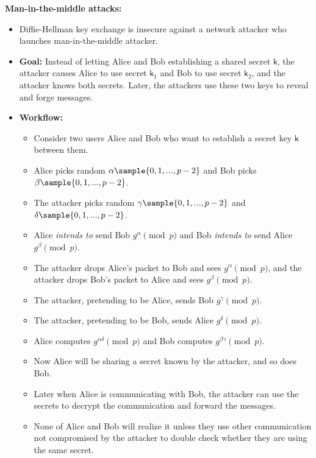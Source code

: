 \documentclass{article}
\newcommand{\msf}[1]{\mathsf{#1}}
\newcommand{\parhead}[1]{\noindent \textbf{#1}}
\begin{document}
\parhead{Man-in-the-middle attacks:}
\begin{itemize}
    \item Diffie-Hellman key exchange is insecure against a network attacker who launches man-in-the-middle attacker.
    
    \item {\bf Goal:} Instead of letting Alice and Bob establishing a shared secret $\msf{k}$, the attacker causes Alice to use secret $\msf{k}_1$ and Bob to use secret $\msf{k}_2$, and the attacker knows both secrets. Later, the attackers use these two keys to reveal and forge messages. 
    
    \item {\bf Workflow:}
    \begin{itemize}
    \item Consider two users Alice and Bob who want to establish a secret key $\msf{k}$ between them.
    
    \item Alice picks random $\alpha\sample\{0,1,...,p-2\}$ and Bob picks $\beta\sample\{0,1,...,p-2\}$.
    
    \item The attacker picks random $\gamma\sample\{0,1,...,p-2\}$ and $\delta\sample\{0,1,...,p-2\}$.
    
    \item Alice \emph{intends to} send Bob $g^\alpha \pmod{p}$ and Bob \emph{intends to} send Alice $g^\beta \pmod{p}$.
    
    \item The attacker drops Alice's packet to Bob and sees $g^\alpha\pmod{p}$, and the attacker drops Bob's packet to Alice and sees $g^\beta\pmod{p}$.
    
    \item The attacker, pretending to be Alice, sends Bob $g^\gamma\pmod{p}$.
    
    \item The attacker, pretending to be Bob, sends Alice $g^\delta\pmod{p}$.
    
    \item Alice computes $g^{\alpha\delta}\pmod{p}$ and Bob computes $g^{\beta\gamma}\pmod{p}$.
    
    \item Now Alice will be sharing a secret known by the attacker, and so does Bob.
    
    \item Later when Alice is communicating with Bob, the attacker can use the secrets to decrypt the communication and forward the messages. 
    
    \item None of Alice and Bob will realize it unless they use other communication not compromised by the attacker to double check whether they are using the same secret.
    \end{itemize}
\end{itemize}
\end{document}
